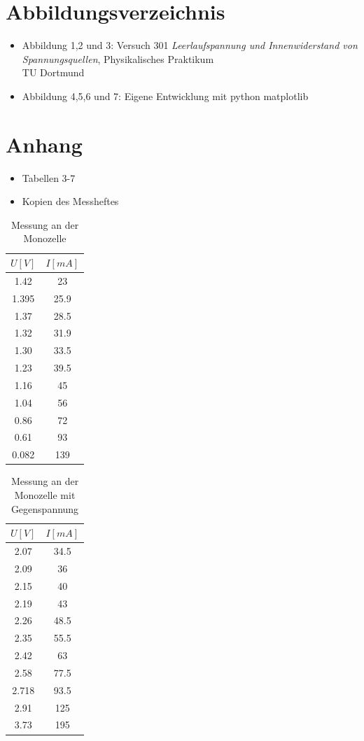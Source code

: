 \documentclass[11pt]{article}
\begin{document}
 \newpage
\section{Abbildungsverzeichnis}
\begin{itemize}
\item Abbildung 1,2 und 3: Versuch 301 \textit{Leerlaufspannung und Innenwiderstand von Spannungsquellen}, Physikalisches Praktikum\\ TU Dortmund
\item Abbildung 4,5,6 und 7: Eigene Entwicklung mit python matplotlib
\end{itemize}
\section{Anhang}
\begin{itemize}
\item Tabellen 3-7
\item Kopien des Messheftes
\end{itemize}
\begin{table}[h]
 \centering
 \caption{Messung an der Monozelle}
 \begin{tabular}{|c|c|}
  \hline
  $U[V]$ & $I[mA]$  \\
  \hline
  1.42 & 23 \\
  1.395 & 25.9 \\
  1.37& 28.5 \\
  1.32 & 31.9 \\
  1.30 & 33.5\\
  1.23 & 39.5\\
  1.16 & 45 \\
  1.04 & 56\\
  0.86 & 72\\
  0.61 & 93\\
  0.082 & 139\\
  \hline
 \end{tabular}
 \label{Messung 1}
 \end{table}
 
 
 \begin{table}[h]
 \centering
 \caption{Messung an der Monozelle mit Gegenspannung}
 \begin{tabular}{|c|c|}
  \hline
  $U[V]$ & $I[mA]$  \\
  \hline
  2.07 & 34.5 \\
  2.09 & 36 \\
  2.15 & 40 \\
  2.19 & 43 \\
  2.26 & 48.5\\
  2.35 & 55.5\\
  2.42 & 63 \\
  2.58 & 77.5\\
  2.718 & 93.5\\
  2.91 & 125\\
  3.73 & 195\\
  \hline
 \end{tabular}
 \label{Messung 2}
 \end{table}
 
\end{document}
